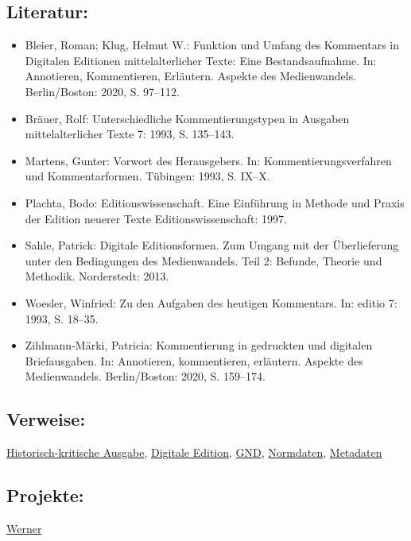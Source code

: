 \documentclass{article}
\begin{document}
        \subsection*{Literatur:}\begin{itemize}\item Bleier, Roman; Klug, Helmut W.: Funktion und Umfang des Kommentars in Digitalen
                              Editionen mittelalterlicher Texte: Eine Bestandsaufnahme. In: Annotieren, Kommentieren, Erläutern. Aspekte des
                              Medienwandels. Berlin/Boston: 2020, S. 97–112.\item Bräuer, Rolf: Unterschiedliche Kommentierungstypen in Ausgaben
                              mittelalterlicher Texte 7: 1993, S. 135–143.\item Martens, Gunter: Vorwort des Herausgebers. In: Kommentierungsverfahren und Kommentarformen. Tübingen: 1993, S. IX–X.\item Plachta, Bodo: Editionswissenschaft. Eine Einführung in Methode und
                              Praxis der Edition neuerer Texte Editionswissenschaft: 1997.\item Sahle, Patrick: Digitale Editionsformen. Zum Umgang mit der
                              Überlieferung unter den Bedingungen des Medienwandels. Teil 2:
                              Befunde, Theorie und Methodik. Norderstedt: 2013.\item Woesler, Winfried: Zu den Aufgaben des heutigen Kommentars. In: editio 7: 1993, S. 18–35.\item Zihlmann-Märki, Patricia: Kommentierung in gedruckten und digitalen
                              Briefausgaben. In: Annotieren, kommentieren, erläutern. Aspekte des
                              Medienwandels. Berlin/Boston: 2020, S. 159–174.\end{itemize}\subsection*{Verweise:}\href{https://gams.uni-graz.at/o:konde.93}{Historisch-kritische Ausgabe}, \href{https://gams.uni-graz.at/o:konde.59}{Digitale Edition}, \href{https://gams.uni-graz.at/o:konde.109}{GND}, \href{https://gams.uni-graz.at/o:konde.147}{Normdaten}, \href{https://gams.uni-graz.at/o:konde.25}{Metadaten}\subsection*{Projekte:}\href{https://gams.uni-graz.at/context:kofler}{Werner
}
\end{document}
